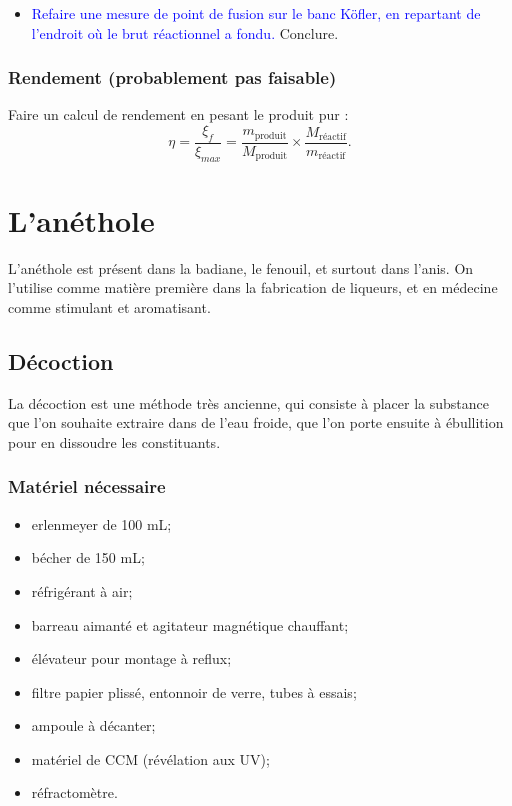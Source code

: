 \documentclass[11pt,a4paper]{report}
\begin{document}
\begin{itemize}
	\item \textcolor{blue}{Refaire une mesure de point de fusion sur le banc Köfler, en repartant de 			l'endroit où le brut réactionnel a fondu.} Conclure.\\ 
\end{itemize}

\subsubsection*{Rendement (probablement pas faisable)}

Faire un calcul de rendement en pesant le produit pur :
	\begin{equation}
		\eta = \frac{\xi_f}{\xi_{max}} = \frac{m_\text{produit}}{M_\text{produit}}\times
		\frac{M_\text{réactif}}{m_\text{réactif}}.
	\end{equation}

\newpage
\section{L'anéthole}\label{sec:2}

L'anéthole est présent dans la badiane, le fenouil, et surtout dans l'anis. On l'utilise comme matière première dans la fabrication de liqueurs, et en médecine comme stimulant et aromatisant.

\subsection{Décoction}

La décoction est une méthode très ancienne, qui consiste à placer la substance que l'on souhaite extraire dans de l'eau froide, que l'on porte ensuite à ébullition pour en dissoudre les constituants.

\subsubsection*{Matériel nécessaire}
\begin{itemize}
	\item erlenmeyer de 100 mL;
	\item bécher de 150 mL;
	\item réfrigérant à air;
	\item barreau aimanté et agitateur magnétique chauffant;
	\item élévateur pour montage à reflux;
	\item filtre papier plissé, entonnoir de verre, tubes à essais;
	\item ampoule à décanter;
	\item matériel de CCM (révélation aux UV);
	\item réfractomètre.
\end{itemize}
\end{document}

